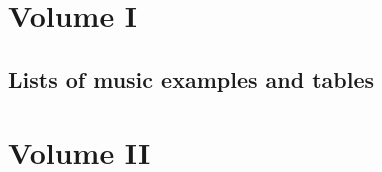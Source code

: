 \documentclass[a4paper,12pt,twoside]{book}
\begin{document}
  \frontmatter

  \part{Volume I}


  
  

  \cleardoublepage

  \singlespacing
  \tableofcontents
  \doublespacing

    

    

    \chapter{Lists of music examples and tables}
    \singlespacing
    \listofexamples
    \newpage
    \listoftables
    \doublespacing

    


  \mainmatter


   
     
    

    

    






\clearpage
{}
  \part{Volume II}
\end{document}

